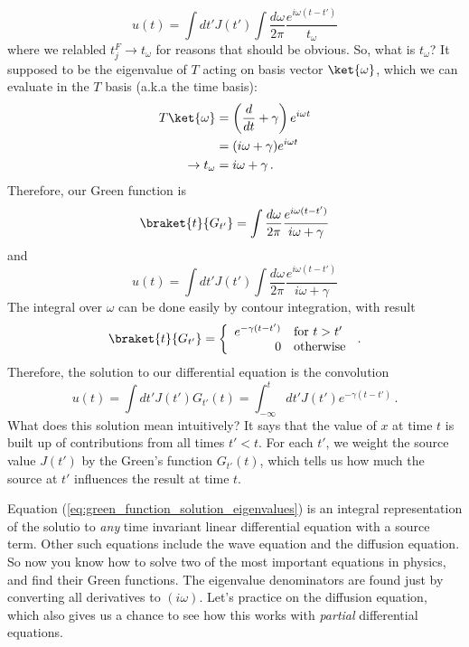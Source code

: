 \begin{equation}
  u(t) = \int dt' J(t') \int \frac{d \omega}{2\pi} \frac{e^{i \omega (t - t')}}{t_\omega}
  \label{eq:green_function_solution_eigenvalues}
\end{equation}
where we relabled $t_j^F \rightarrow t_\omega$ for reasons that should be obvious.
So, what is $t_\omega$?
It supposed to be the eigenvalue of $T$ acting on basis vector $\ket{\omega}$, which we can evaluate in the $T$ basis (a.k.a the time basis):
\begin{align*}
  T \ket{\omega}
  &= \left( \frac{d}{dt} + \gamma \right) e^{i \omega t} \\
  &= ( i \omega + \gamma ) e^{i \omega t} \\
  \rightarrow t_\omega &= i\omega + \gamma
  \, .
\end{align*}
Therefore, our Green function is
\begin{equation*}
  \braket{t}{G_{t'}} = \int \frac{d \omega}{2\pi} \frac{e^{i \omega (t - t')}}{i \omega + \gamma}
\end{equation*}
and
\begin{equation}
  u(t) = \int dt' J(t') \int \frac{d\omega}{2\pi} \frac{e^{i \omega (t - t')}}{i \omega + \gamma}
\end{equation}
The integral over $\omega$ can be done easily by contour integration, with result
\begin{equation}
  \braket{t}{G_{t'}} = \left\{
    \begin{array}{rl}
      e^{-\gamma (t - t')} & \text{for } t > t' \\
      0 & \text{otherwise}
    \end{array}
  \right.
  \, .
\end{equation}
Therefore, the solution to our differential equation is the convolution
\begin{equation}
  u(t) = \int dt' J(t') G_{t'}(t) = \int_{-\infty}^t dt' J(t') e^{-\gamma (t - t')}
  \, .
\end{equation}
What does this solution mean intuitively?
It says that the value of $x$ at time $t$ is built up of contributions from all times $t' < t$.
For each $t'$, we weight the source value $J(t')$ by the Green's function $G_{t'}(t)$, which tells us how much the source at $t'$ influences the result at time $t$.

Equation (\ref{eq:green_function_solution_eigenvalues}) is an integral representation of the solutio to \emph{any} time invariant linear differential equation with a source term.
Other such equations include the wave equation and the diffusion equation.
So now you know how to solve two of the most important equations in physics, and find their Green functions.
The eigenvalue denominators are found just by converting all derivatives to $(i \omega)$.
Let's practice on the diffusion equation, which also gives us a chance to see how this works with \emph{partial} differential equations.

